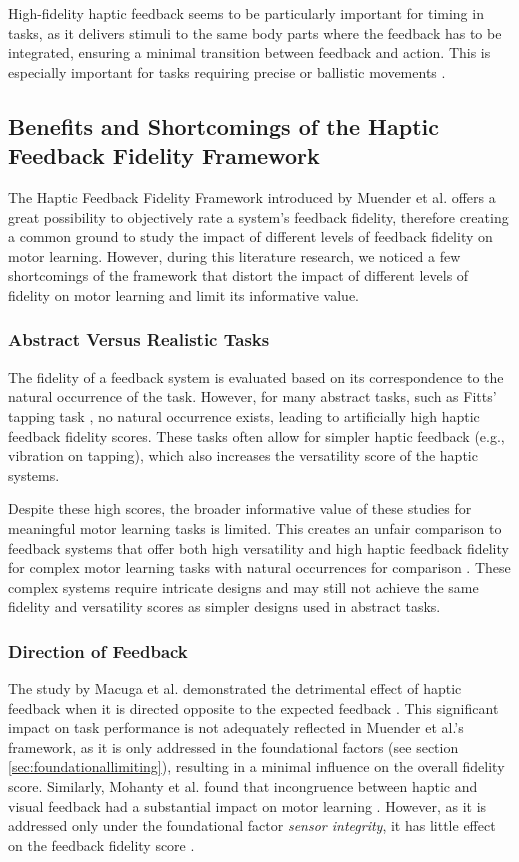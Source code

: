 High-fidelity haptic feedback seems to be particularly important for timing in tasks, as it delivers stimuli to the same body parts where the feedback has to be integrated, ensuring a minimal transition between feedback and action. This is especially important for tasks requiring precise or ballistic movements \cite{Mohanty2023, Wall2000}.

\subsection{Benefits and Shortcomings of the Haptic Feedback Fidelity Framework}
The Haptic Feedback Fidelity Framework introduced by Muender et al. offers a great possibility to objectively rate a system's feedback fidelity, therefore creating a common ground to study the impact of different levels of feedback fidelity on motor learning. However, during this literature research, we noticed a few shortcomings of the framework that distort the impact of different levels of fidelity on motor learning and limit its informative value.

\subsubsection{Abstract Versus Realistic Tasks}
The fidelity of a feedback system is evaluated based on its correspondence to the natural occurrence of the task. However, for many abstract tasks, such as Fitts' tapping task \cite{Fitts1954TheMovement}, no natural occurrence exists, leading to artificially high haptic feedback fidelity scores. These tasks often allow for simpler haptic feedback (e.g., vibration on tapping), which also increases the versatility score of the haptic systems. 

Despite these high scores, the broader informative value of these studies for meaningful motor learning tasks is limited. This creates an unfair comparison to feedback systems that offer both high versatility and high haptic feedback fidelity for complex motor learning tasks with natural occurrences for comparison \cite{LeeY2019, LiuH2019, Oezen2022}. These complex systems require intricate designs and may still not achieve the same fidelity and versatility scores as simpler designs used in abstract tasks.


\subsubsection{Direction of Feedback}
The study by Macuga et al. demonstrated the detrimental effect of haptic feedback when it is directed opposite to the expected feedback \cite{Macuga2019}. This significant impact on task performance is not adequately reflected in Muender et al.'s framework, as it is only addressed in the foundational factors (see section \ref{sec:foundationallimiting}), resulting in a minimal influence on the overall fidelity score. Similarly, Mohanty et al. found that incongruence between haptic and visual feedback had a substantial impact on motor learning \cite{Mohanty2023}. However, as it is addressed only under the foundational factor \textit{sensor integrity}, it has little effect on the feedback fidelity score \cite{Muender2022HapticReality}.

